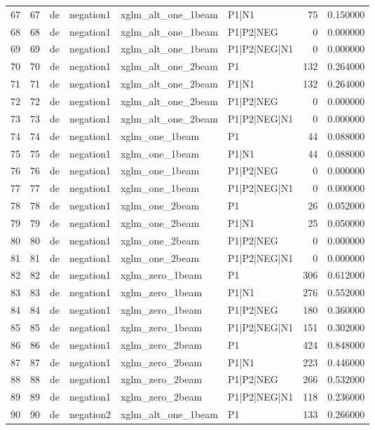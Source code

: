 \begin{tabular}{lrllllrr}
67 & 67 & de & negation1 & xglm_alt_one_1beam & P1|N1 & 75 & 0.150000 \\
68 & 68 & de & negation1 & xglm_alt_one_1beam & P1|P2|NEG & 0 & 0.000000 \\
69 & 69 & de & negation1 & xglm_alt_one_1beam & P1|P2|NEG|N1 & 0 & 0.000000 \\
70 & 70 & de & negation1 & xglm_alt_one_2beam & P1 & 132 & 0.264000 \\
71 & 71 & de & negation1 & xglm_alt_one_2beam & P1|N1 & 132 & 0.264000 \\
72 & 72 & de & negation1 & xglm_alt_one_2beam & P1|P2|NEG & 0 & 0.000000 \\
73 & 73 & de & negation1 & xglm_alt_one_2beam & P1|P2|NEG|N1 & 0 & 0.000000 \\
74 & 74 & de & negation1 & xglm_one_1beam & P1 & 44 & 0.088000 \\
75 & 75 & de & negation1 & xglm_one_1beam & P1|N1 & 44 & 0.088000 \\
76 & 76 & de & negation1 & xglm_one_1beam & P1|P2|NEG & 0 & 0.000000 \\
77 & 77 & de & negation1 & xglm_one_1beam & P1|P2|NEG|N1 & 0 & 0.000000 \\
78 & 78 & de & negation1 & xglm_one_2beam & P1 & 26 & 0.052000 \\
79 & 79 & de & negation1 & xglm_one_2beam & P1|N1 & 25 & 0.050000 \\
80 & 80 & de & negation1 & xglm_one_2beam & P1|P2|NEG & 0 & 0.000000 \\
81 & 81 & de & negation1 & xglm_one_2beam & P1|P2|NEG|N1 & 0 & 0.000000 \\
82 & 82 & de & negation1 & xglm_zero_1beam & P1 & 306 & 0.612000 \\
83 & 83 & de & negation1 & xglm_zero_1beam & P1|N1 & 276 & 0.552000 \\
84 & 84 & de & negation1 & xglm_zero_1beam & P1|P2|NEG & 180 & 0.360000 \\
85 & 85 & de & negation1 & xglm_zero_1beam & P1|P2|NEG|N1 & 151 & 0.302000 \\
86 & 86 & de & negation1 & xglm_zero_2beam & P1 & 424 & 0.848000 \\
87 & 87 & de & negation1 & xglm_zero_2beam & P1|N1 & 223 & 0.446000 \\
88 & 88 & de & negation1 & xglm_zero_2beam & P1|P2|NEG & 266 & 0.532000 \\
89 & 89 & de & negation1 & xglm_zero_2beam & P1|P2|NEG|N1 & 118 & 0.236000 \\
90 & 90 & de & negation2 & xglm_alt_one_1beam & P1 & 133 & 0.266000 \\

\end{tabular}
